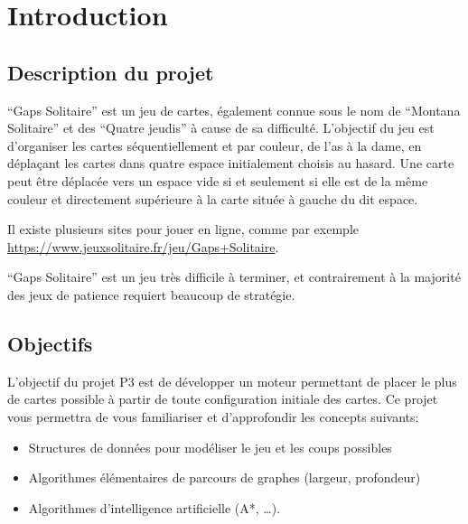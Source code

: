 \chapter{Introduction}

\section{Description du projet}
“Gaps Solitaire” est un jeu de cartes, également connue sous le nom de “Montana Solitaire” et des “Quatre jeudis” à cause de sa difficulté. L'objectif du jeu est d'organiser les cartes séquentiellement et par couleur, de l'as à la dame, en déplaçant les cartes dans quatre espace initialement choisis au hasard. Une carte peut être déplacée vers un espace vide si et seulement si elle est de la même couleur et directement supérieure à la carte située à gauche du dit espace.

Il existe plusieurs sites pour jouer en ligne, comme par exemple \url{https://www.jeuxsolitaire.fr/jeu/Gaps+Solitaire}.

“Gaps Solitaire” est un jeu très difficile à terminer, et contrairement à la majorité des jeux de patience requiert beaucoup de stratégie.

\section{Objectifs}
L'objectif du projet P3 est de développer un moteur permettant de placer le plus de cartes possible à partir de toute configuration initiale des cartes. Ce projet vous permettra de vous familiariser et d’approfondir les concepts suivants:

\begin{itemize}
    \item Structures de données pour modéliser le jeu et les coups possibles
    \item Algorithmes élémentaires de parcours de graphes (largeur, profondeur)
    \item Algorithmes d'intelligence artificielle (A*, …).
\end{itemize}

